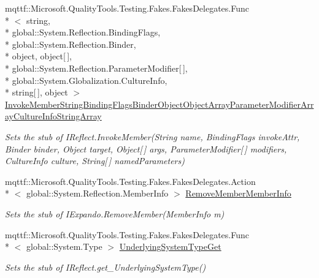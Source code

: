 \begin{DoxyCompactItemize}
mqttf\-::\-Microsoft.\-Quality\-Tools.\-Testing.\-Fakes.\-Fakes\-Delegates.\-Func\\*
$<$ string, \\*
global\-::\-System.\-Reflection.\-Binding\-Flags, \\*
global\-::\-System.\-Reflection.\-Binder, \\*
object, object\mbox{[}$\,$\mbox{]}, \\*
global\-::\-System.\-Reflection.\-Parameter\-Modifier\mbox{[}$\,$\mbox{]}, \\*
global\-::\-System.\-Globalization.\-Culture\-Info, \\*
string\mbox{[}$\,$\mbox{]}, object $>$ \hyperlink{class_system_1_1_runtime_1_1_interop_services_1_1_expando_1_1_fakes_1_1_stub_i_expando_a6034419a145e65f90ed272ae4e96ec4c}{Invoke\-Member\-String\-Binding\-Flags\-Binder\-Object\-Object\-Array\-Parameter\-Modifier\-Array\-Culture\-Info\-String\-Array}
\begin{DoxyCompactList}\small\item\em Sets the stub of I\-Reflect.\-Invoke\-Member(\-String name, Binding\-Flags invoke\-Attr, Binder binder, Object target, Object\mbox{[}$\,$\mbox{]} args, Parameter\-Modifier\mbox{[}$\,$\mbox{]} modifiers, Culture\-Info culture, String\mbox{[}$\,$\mbox{]} named\-Parameters)\end{DoxyCompactList}\item 
mqttf\-::\-Microsoft.\-Quality\-Tools.\-Testing.\-Fakes.\-Fakes\-Delegates.\-Action\\*
$<$ global\-::\-System.\-Reflection.\-Member\-Info $>$ \hyperlink{class_system_1_1_runtime_1_1_interop_services_1_1_expando_1_1_fakes_1_1_stub_i_expando_aafa8eb788e80aa4aa5cc421919ff2e03}{Remove\-Member\-Member\-Info}
\begin{DoxyCompactList}\small\item\em Sets the stub of I\-Expando.\-Remove\-Member(\-Member\-Info m)\end{DoxyCompactList}\item 
mqttf\-::\-Microsoft.\-Quality\-Tools.\-Testing.\-Fakes.\-Fakes\-Delegates.\-Func\\*
$<$ global\-::\-System.\-Type $>$ \hyperlink{class_system_1_1_runtime_1_1_interop_services_1_1_expando_1_1_fakes_1_1_stub_i_expando_a7c0345f9f4bc303463818294e2d487dd}{Underlying\-System\-Type\-Get}
\begin{DoxyCompactList}\small\item\em Sets the stub of I\-Reflect.\-get\-\_\-\-Underlying\-System\-Type()\end{DoxyCompactList}\end{DoxyCompactItemize}


